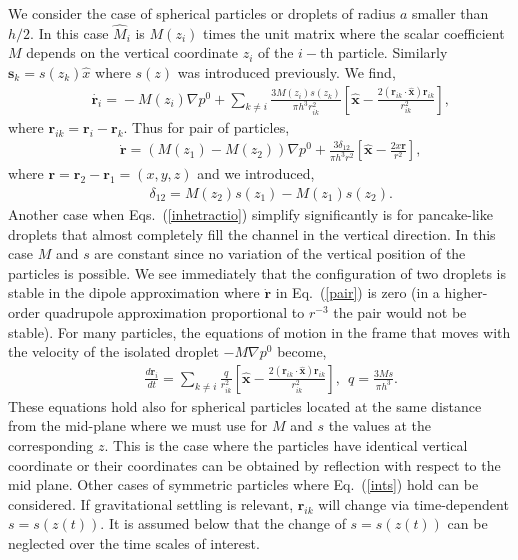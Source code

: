 We consider the case of spherical particles or droplets of radius $a$ smaller than $h/2$. In this case ${\hat M}_i$ is $M(z_i)$ times the unit matrix where the scalar coefficient $M$ depends on the vertical coordinate $z_i$ of the $i-$th particle. Similarly $\bm s_k=s(z_k){\hat x}$ where $s(z)$ was introduced previously. We find,
\begin{eqnarray}&&
\dot{\bm r_i}%
\!=\!-\! M(z_i)\nabla p^0\! +\!\sum_{k\neq i}\! \frac{3M(z_i) s(z_k)}{\pi h^3r_{ik}^2}\!\left[\bm {\hat x}\!-\!\frac{2 \left(\bm r_{ik}\cdot\bm {\hat x}\right) \bm r_{ik}}{r_{ik}^2}\right], \nonumber%
\end{eqnarray}
where $\bm r_{ik}=\bm r_i-\bm r_k$. Thus for pair of particles,
\begin{eqnarray}&&
\dot{\bm r}%
\!=%
\left(M(z_1)\!-\! M(z_2)\right)
\nabla p^0\! +\!\frac{3\delta_{12}}{\pi h^3r^2}\!\left[\bm {\hat x}\!-\!\frac{2 x \bm r}{r^2}\right], %
\label{pair}
\end{eqnarray}
where $\bm r=\bm r_2-\bm r_1=(x, y, z)$ and we introduced,%
\begin{eqnarray}&&
\delta_{12}=M(z_2) s(z_1)-M(z_1) s(z_2).
\end{eqnarray}
Another case when Eqs.~(\ref{inhetractio}) simplify significantly is for pancake-like droplets that almost completely fill the channel in the vertical direction. In this case $M$ and $s$ are constant since no variation of the vertical position of the particles is possible. We see immediately that the configuration of two droplets is stable in the dipole approximation where $\dot{\bm r}$ in Eq.~(\ref{pair}) is zero (in a higher-order quadrupole approximation proportional to $r^{-3}$ the pair would not be stable). For many particles, the equations of motion in the frame that moves with the velocity of the isolated droplet $-M\nabla p^0$ become,
\begin{eqnarray}&&\!\!\!\!\!\!\!\!\!\!\!\!\!\!\!\!
\frac{d\bm r_i}{dt}=\sum_{k\neq i}\frac{q}{r_{ik}^2}\left[\bm {\hat x}\!-\!\frac{2 \left(\bm r_{ik}\cdot\bm {\hat x}\right) \bm r_{ik}}{r_{ik}^2}\right],\ \ q= \frac{3M s}{\pi h^3}. \label{ints}
\end{eqnarray}
These equations hold also for spherical particles located at the same distance from the mid-plane where we must use for $M$ and $s$ the values at the corresponding $z$. This is the case where the particles have identical vertical coordinate or their coordinates can be obtained by reflection with respect to the mid plane. Other cases of symmetric particles where Eq.~(\ref{ints}) hold can be considered. If gravitational settling is relevant,  $\bm r_{ik}$ will change via time-dependent $s=s(z(t))$. It is assumed below that the change of $s=s(z(t))$ can be neglected over the time scales of interest.

